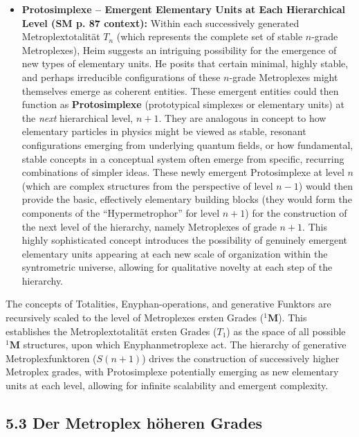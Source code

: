 \documentclass[12pt]{article}
\newcommand{\q}[1]{\enquote{#1}}
\newcommand{\metroplex}[1]{{}^{#1}\mathbf{M}}
\newcommand{\hypersyntrix}{\metroplex{1}}
\newcommand{\metroplextotalitaet}[1]{T_{#1}}
\newcommand{\metroplexfunktor}{S}
\begin{document}
\begin{itemize}
    \item \textbf{Protosimplexe – Emergent Elementary Units at Each Hierarchical Level (SM p. 87 context):}
    Within each successively generated Metroplextotalität \( \metroplextotalitaet{n} \) (which represents the complete set of stable \( n \)-grade Metroplexes), Heim suggests an intriguing possibility for the emergence of new types of elementary units. He posits that certain minimal, highly stable, and perhaps irreducible configurations of these \( n \)-grade Metroplexes might themselves emerge as coherent entities. These emergent entities could then function as \textbf{Protosimplexe} (prototypical simplexes or elementary units) at the \textit{next} hierarchical level, \( n+1 \). They are analogous in concept to how elementary particles in physics might be viewed as stable, resonant configurations emerging from underlying quantum fields, or how fundamental, stable concepts in a conceptual system often emerge from specific, recurring combinations of simpler ideas. These newly emergent Protosimplexe at level \( n \) (which are complex structures from the perspective of level \(n-1\)) would then provide the basic, effectively elementary building blocks (they would form the components of the \q{Hypermetrophor} for level \(n+1\)) for the construction of the next level of the hierarchy, namely Metroplexes of grade \( n+1 \). This highly sophisticated concept introduces the possibility of genuinely emergent elementary units appearing at each new scale of organization within the syntrometric universe, allowing for qualitative novelty at each step of the hierarchy.
\end{itemize}

The concepts of Totalities, Enyphan-operations, and generative Funktors are recursively scaled to the level of Metroplexes ersten Grades (\(\hypersyntrix\)). This establishes the Metroplextotalität ersten Grades (\(\metroplextotalitaet{1}\)) as the space of all possible \(\hypersyntrix\) structures, upon which Enyphanmetroplexe act. The hierarchy of generative Metroplexfunktoren (\(\metroplexfunktor(n+1)\)) drives the construction of successively higher Metroplex grades, with Protosimplexe potentially emerging as new elementary units at each level, allowing for infinite scalability and emergent complexity.

\subsection{5.3 Der Metroplex höheren Grades}
\label{sec:higher_metroplex}
\end{document}
